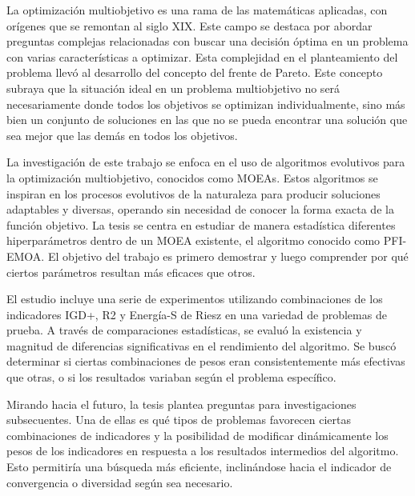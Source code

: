 


\begin{abstracts}        %


La optimización multiobjetivo es una rama de las matemáticas aplicadas, con orígenes que se remontan al siglo XIX. Este campo se destaca por abordar preguntas complejas relacionadas con buscar una decisión óptima en un problema con varias características a optimizar. Esta complejidad en el planteamiento del problema llevó al desarrollo del concepto del frente de Pareto. Este concepto subraya que la situación ideal en un problema multiobjetivo no será necesariamente donde todos los  objetivos se optimizan individualmente, sino más bien un conjunto de soluciones en las que no se pueda encontrar una solución que sea mejor que las demás en todos los objetivos.

La investigación de este trabajo se enfoca en el uso de algoritmos evolutivos para la optimización multiobjetivo, conocidos como MOEAs. Estos algoritmos se inspiran en los procesos evolutivos de la naturaleza para producir soluciones adaptables y diversas, operando sin necesidad de conocer la forma exacta de la función objetivo. La tesis se centra en estudiar de manera estadística diferentes hiperparámetros dentro de un MOEA existente, el algoritmo conocido como PFI-EMOA. El objetivo del trabajo es primero demostrar y luego comprender por qué ciertos parámetros resultan más eficaces que otros.

El estudio incluye una serie de experimentos utilizando combinaciones de los indicadores IGD+, R2 y Energía-S de Riesz en una variedad de problemas de prueba. A través de comparaciones estadísticas, se evaluó la existencia y magnitud de diferencias significativas en el rendimiento del algoritmo. Se buscó determinar si ciertas combinaciones de pesos eran consistentemente más efectivas que otras, o si los resultados variaban según el problema específico.

Mirando hacia el futuro, la tesis plantea preguntas para investigaciones subsecuentes. Una de ellas es qué tipos de problemas favorecen ciertas combinaciones de indicadores y la posibilidad de modificar dinámicamente los pesos de los indicadores en respuesta a los resultados intermedios del algoritmo. Esto permitiría una búsqueda más eficiente, inclinándose hacia el indicador de convergencia o diversidad según sea necesario.

\end{abstracts}


